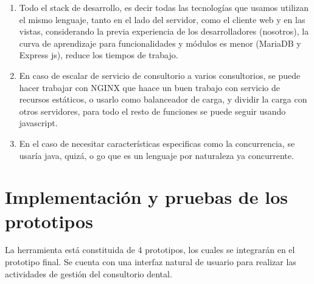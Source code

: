 \begin{enumerate}
     \item Todo el stack de desarrollo, es decir todas las tecnologías que usamos utilizan el mismo lenguaje, tanto en el lado del servidor, como el cliente web y en las vistas, considerando la previa experiencia de los desarrolladores (nosotros), la curva de aprendizaje para funcionalidades y módulos es menor (MariaDB y Express js), reduce los tiempos de trabajo.
     \item En caso de escalar de servicio de consultorio a varios consultorios, se puede hacer trabajar con NGINX que haace un buen trabajo con servicio de recursos estáticos, o usarlo como balanceador de carga, y dividir la carga con otros servidores, para todo el resto de funciones se puede seguir usando javascript.
     \item En el caso de necesitar características especificas como la concurrencia, se usaría java, quizá, o go que es un lenguaje por naturaleza ya concurrente.
\end{enumerate}














\newpage
\section{Implementación y pruebas de los prototipos}

\noindent
La herramienta está constituida de 4 prototipos, los cuales se integrarán en el prototipo final. Se cuenta con una interfaz natural de usuario para realizar las actividades de gestión del consultorio dental.

